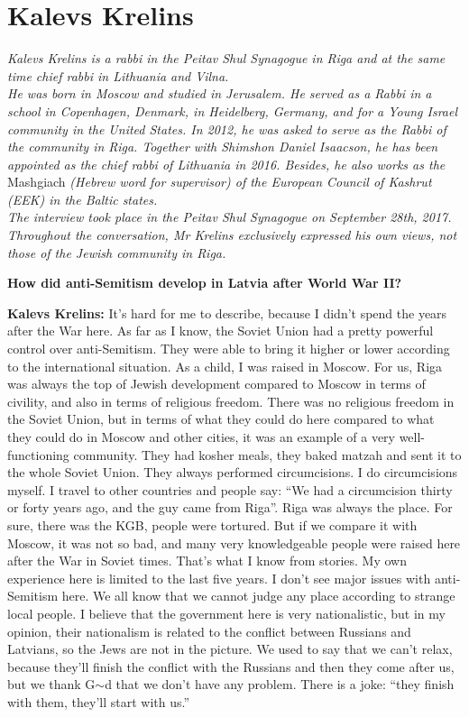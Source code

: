 \section{Kalevs Krelins}

\textit{Kalevs Krelins is a rabbi in the Peitav Shul Synagogue in Riga and at the same time chief rabbi in Lithuania and Vilna.\\
He was born in Moscow and studied in Jerusalem. He served as a Rabbi in a school in Copenhagen, Denmark, in Heidelberg, Germany, and for a Young Israel community in the United States. In 2012, he was asked to serve as the Rabbi of the community in Riga. Together with Shimshon Daniel Isaacson, he has been appointed as the chief rabbi of Lithuania in 2016. Besides, he also works as the} Mashgiach \textit{(Hebrew word for supervisor) of the European Council of Kashrut (EEK) in the Baltic states.\\
The interview took place in the Peitav Shul Synagogue on September 28th, 2017. Throughout the conversation, Mr Krelins exclusively expressed his own views, not those of the Jewish community in Riga.} \par 
\vspace*{2em}
\textbf{How did anti-Semitism develop in Latvia after World War II?}  

\textbf{Kalevs Krelins:} It’s hard for me to describe, because I didn’t spend the years after the War here. As far as I know, the Soviet Union had a pretty powerful control over anti-Semitism. They were able to bring it higher or lower according to the international situation. As a child, I was raised in Moscow. For us, Riga was always the top of Jewish development compared to Moscow in terms of civility, and also in terms of religious freedom. There was no religious freedom in the Soviet Union, but in terms of what they could do here compared to what they could do in Moscow and other cities, it was an example of a very well-functioning community. They had kosher meals, they baked matzah and sent it to the whole Soviet Union. They always performed circumcisions. I do circumcisions myself. I travel to other countries and people say: ``We had a circumcision thirty or forty years ago, and the guy came from Riga''. Riga was always the place. For sure, there was the KGB, people were tortured. But if we compare it with Moscow, it was not so bad, and many very knowledgeable people were raised here after the War in Soviet times. That’s what I know from stories. My own experience here is limited to the last five years. I don’t see major issues with anti-Semitism here.  We all know that we cannot judge any place according to strange local people. I believe that the government here is very nationalistic, but in my opinion, their nationalism is related to the conflict between Russians and Latvians, so the Jews are not in the picture. We used to say that we can’t relax, because they’ll finish the conflict with the Russians and then they come after us, but we thank G$\sim$d that we don’t have any problem. There is a joke: ``they finish with them, they’ll start with us.''  

